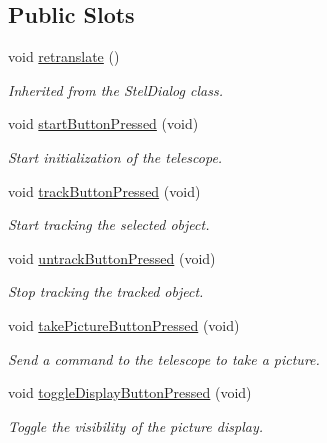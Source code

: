 \subsection*{Public Slots}
\begin{DoxyCompactItemize}
\item 
void \hyperlink{class_autoscope_window_form_a3f3d731c45d104fee58dd4c2dcc6fd86}{retranslate} ()
\begin{DoxyCompactList}\small\item\em Inherited from the Stel\+Dialog class. \end{DoxyCompactList}\item 
void \hyperlink{class_autoscope_window_form_ac6b0a28c17efb188b234ce1c08baa82d}{start\+Button\+Pressed} (void)
\begin{DoxyCompactList}\small\item\em Start initialization of the telescope. \end{DoxyCompactList}\item 
void \hyperlink{class_autoscope_window_form_ad7b04807a37c5014ab3a151d2ce720b7}{track\+Button\+Pressed} (void)
\begin{DoxyCompactList}\small\item\em Start tracking the selected object. \end{DoxyCompactList}\item 
void \hyperlink{class_autoscope_window_form_a867b2e9355138f8b41c17dba563c43ef}{untrack\+Button\+Pressed} (void)
\begin{DoxyCompactList}\small\item\em Stop tracking the tracked object. \end{DoxyCompactList}\item 
void \hyperlink{class_autoscope_window_form_ac78048dc833bd4952108cb5fe8cac6f8}{take\+Picture\+Button\+Pressed} (void)
\begin{DoxyCompactList}\small\item\em Send a command to the telescope to take a picture. \end{DoxyCompactList}\item 
void \hyperlink{class_autoscope_window_form_ae7caa21b226f06d2f32fd6da6d539bbf}{toggle\+Display\+Button\+Pressed} (void)
\begin{DoxyCompactList}\small\item\em Toggle the visibility of the picture display. \end{DoxyCompactList}\end{DoxyCompactItemize}
